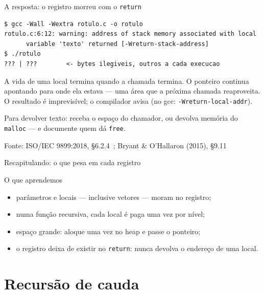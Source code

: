 \documentclass[aspectratio=169]{beamer}
\newcommand{\fonte}[1]{\vfill\hfill{\scriptsize\textcolor{UFSGray}{Fonte: #1}}}
\begin{document}
\begin{frame}[fragile]{A resposta: o registro morreu com o \texttt{return}}
\begin{lstlisting}[style=shellStyle]
$ gcc -Wall -Wextra rotulo.c -o rotulo
rotulo.c:6:12: warning: address of stack memory associated with local
      variable 'texto' returned [-Wreturn-stack-address]
$ ./rotulo
??? | ???        <- bytes ilegiveis, outros a cada execucao
\end{lstlisting}
  \begin{block}{}
    \small A vida de uma local termina quando a chamada termina. O ponteiro
    continua apontando para onde ela estava --- uma área que a próxima
    chamada reaproveita. O resultado é imprevisível; o compilador avisa
    (no gcc: \texttt{-Wreturn-local-addr}).
  \end{block}
  \begin{center}
    \small Para devolver texto: receba o espaço do chamador, ou devolva
    memória do \texttt{malloc} --- e documente quem dá \texttt{free}.
  \end{center}
  \fonte{ISO/IEC 9899:2018, §6.2.4~\cite{iso2018c17};
    Bryant \& O'Hallaron (2015), §9.11~\cite{bryant2015computer}}
\end{frame}

\begin{frame}{Recapitulando: o que pesa em cada registro}
  \begin{block}{O que aprendemos}
    \begin{itemize}
      \item parâmetros e locais --- inclusive vetores --- moram no
        registro;
      \item numa função recursiva, cada local é paga uma vez por nível;
      \item espaço grande: aloque uma vez no heap e passe o ponteiro;
      \item o registro deixa de existir no \texttt{return}: nunca devolva
        o endereço de uma local.
    \end{itemize}
  \end{block}
\end{frame}

\section{Recursão de cauda}
\end{document}
